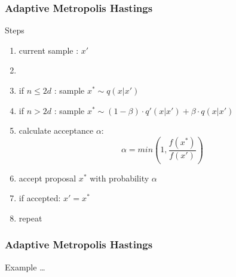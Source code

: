 \begin{frame}
\frametitle{Adaptive Metropolis Hastings}

\begin{block}{Steps}
\begin{enumerate}
  \item current sample : $x'$
  \item[]
\item if $n\leq 2d$ : sample $x^* \sim q(x | x')$
\item if $n> 2d$ : sample $x^* \sim (1-\beta) \cdot q'(x | x') +
\beta \cdot q(x | x')$
\item calculate acceptance $\alpha$:
\[\alpha = min\left(1, \frac{f(x^*)}{f(x')} \right)\]

\item accept proposal $x^*$ with probability $\alpha$
\item if accepted: $x' = x^*$
\item repeat
\end{enumerate}
\end{block}
\end{frame}

\begin{frame}
\frametitle{Adaptive Metropolis Hastings}
Example \ldots
\end{frame}